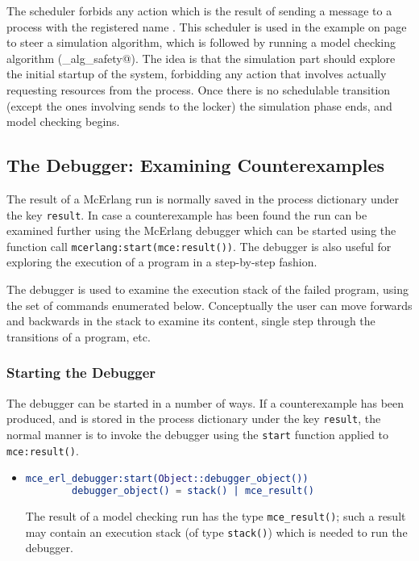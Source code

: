 \documentclass[a4paper]{article}
\begin{document}
The scheduler forbids any action which is the result of sending
a message to a process with the registered name \lstinline@locker@.
This scheduler is used in the example on page~\pageref{mce_alg_combine}
to steer a simulation algorithm, which is followed by running
a model checking algorithm (\lstinline@mce_alg_safety@).
The idea is that the simulation part should explore the initial startup
of the system, forbidding any action that involves actually requesting
resources from the \lstinline@locker@ process. Once there is no schedulable
transition (except the ones involving sends to the locker) the simulation
phase ends, and model checking begins.

\subsection{The Debugger: Examining Counterexamples}
\label{debugger}

The result of a McErlang run is normally saved in the process dictionary
under the key \lstinline{result}. In case a counterexample has been
found the run can be examined further using the McErlang debugger which
can be started using the function call 
\lstinline{mcerlang:start(mce:result())}. The debugger is also
useful for exploring the execution of a program in a step-by-step
fashion.

The debugger is used to examine the execution stack of the 
failed program, using the set of commands enumerated below. 
Conceptually the user can move forwards and backwards in the stack 
to examine its content, single step through the transitions of 
a program, etc.

\subsubsection{Starting the Debugger}

The debugger can be started in a number
of ways. If a counterexample has been produced, and is stored
in the process dictionary under the key \lstinline{result},
the normal manner is to invoke the debugger using the \lstinline{start}
function applied to \lstinline{mce:result()}.

\begin{itemize}
\item
\begin{lstlisting}[language=Erlang]
mce_erl_debugger:start(Object::debugger_object())
        debugger_object() = stack() | mce_result()
\end{lstlisting}
The result of a model checking run has the type \lstinline{mce_result()};
such a result may contain an execution stack (of type \lstinline{stack()}) which
is needed to run the debugger.
\end{itemize}
\end{document}
